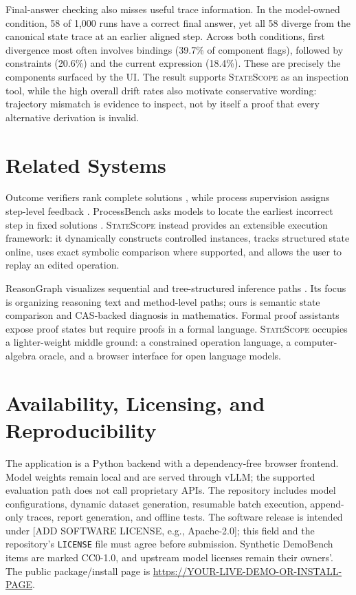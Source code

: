 \documentclass[11pt]{article}
\newcommand{\systemname}{\textsc{StateScope}}
\newcommand{\demourl}{https://YOUR-LIVE-DEMO-OR-INSTALL-PAGE}
\newcommand{\softwarelicense}{[ADD SOFTWARE LICENSE, e.g., Apache-2.0]}
\begin{document}
Final-answer checking also misses useful trace information.  In the model-owned
condition, 58 of 1,000 runs have a correct final answer, yet all 58 diverge from the
canonical state trace at an earlier aligned step.  Across both conditions, first
divergence most often involves bindings (39.7\% of component flags), followed by
constraints (20.6\%) and the current expression (18.4\%).  These are precisely the
components surfaced by the UI.  The result supports \systemname{} as an inspection
tool, while the high overall drift rates also motivate conservative wording:
trajectory mismatch is evidence to inspect, not by itself a proof that every
alternative derivation is invalid.

\section{Related Systems}

Outcome verifiers rank complete solutions \citep{cobbe2021verifiers}, while process
supervision assigns step-level feedback \citep{lightman2023verify}.  ProcessBench
asks models to locate the earliest incorrect step in fixed solutions
\citep{zheng2025processbench}.  \systemname{} instead provides an extensible
execution framework: it dynamically constructs controlled instances, tracks
structured state online, uses exact symbolic comparison where supported, and allows
the user to replay an edited operation.

ReasonGraph visualizes sequential and tree-structured inference paths
\citep{li2025reasongraph}.  Its focus is organizing reasoning text and method-level
paths; ours is semantic state comparison and CAS-backed diagnosis in mathematics.
Formal proof assistants expose proof states but require proofs in a formal language.
\systemname{} occupies a lighter-weight middle ground: a constrained operation
language, a computer-algebra oracle, and a browser interface for open language
models.

\section{Availability, Licensing, and Reproducibility}

The application is a Python backend with a dependency-free browser frontend.  Model
weights remain local and are served through vLLM; the supported evaluation path does
not call proprietary APIs.  The repository includes model configurations, dynamic
dataset generation, resumable batch execution, append-only traces, report generation,
and offline tests.  The software release is intended under \softwarelicense; this field
and the repository's \texttt{LICENSE} file must agree before submission.  Synthetic
DemoBench items are marked CC0-1.0, and upstream model licenses remain their owners'.
The public package/install page is \url{\demourl}.
\end{document}
